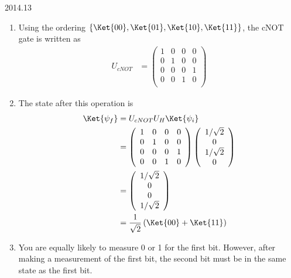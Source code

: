 \documentclass[12pt]{article}
\begin{document}
\begin{solution}{2014.13}
\begin{enumerate}
\item
Using the ordering $\{ \Ket{00}, \Ket{01}, \Ket{10}, \Ket{11} \}$, the cNOT gate is written as
\begin{align*}
U_{cNOT} & = \left( \begin{array}{cccc}
1 & 0 & 0 & 0 \\
0 & 1 & 0 & 0 \\
0 & 0 & 0 & 1 \\
0 & 0 & 1 & 0 \\
\end{array} \right)
\end{align*}

\item
The state after this operation is
\begin{align*}
\Ket{\psi_f} & = U_{cNOT} U_H \Ket{\psi_i} \\
& = \left( \begin{array}{cccc}
1 & 0 & 0 & 0 \\
0 & 1 & 0 & 0 \\
0 & 0 & 0 & 1 \\
0 & 0 & 1 & 0 \\
\end{array} \right) \left( \begin{array}{c}
1/\sqrt{2} \\
0 \\
1/\sqrt{2} \\
0 \\
\end{array} \right) \\
& = \left( \begin{array}{c}
1/\sqrt{2} \\
0 \\
0 \\
1/\sqrt{2} \\
\end{array} \right) \\
& = \frac{1}{\sqrt{2}} \left( \Ket{00} + \Ket{11} \right)
\end{align*}

\item
You are equally likely to measure 0 or 1 for the first bit.
However, after making a measurement of the first bit, the second bit must be in the same state as the first bit.

\end{enumerate}


\end{solution}
\end{document}

